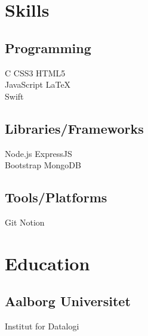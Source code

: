 \documentclass[]{plushcv}
\begin{document}
\begin{minipage}[t]{0.25\textwidth} 


\section{Skills}
\subsection{Programming}
\sectionsep
{}
C \textbullet{} CSS3 \textbullet{} HTML5 \\
\sectionsep
{}
JavaScript \textbullet{} \LaTeX\ \\
\sectionsep
{}
Swift \\
\sectionsep
\sectionsep
\subsection{Libraries/Frameworks}
\sectionsep
Node.js \textbullet{} ExpressJS\\
\textbullet{} Bootstrap \textbullet{} MongoDB \\
\sectionsep
\sectionsep
\subsection{Tools/Platforms}
\sectionsep
Git \textbullet{} Notion\\

\sectionsep


\section{Education} 
\sectionsep
\subsection{Aalborg Universitet}
Institut for Datalogi \\
\sectionsep



\end{minipage}
\end{document}
